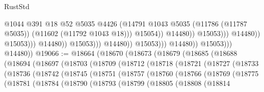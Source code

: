 \begin{lexlean}{RustStd}
\begin{coremodule}
                                                              @1044
                                                              @391
                                                              @18
                                                              @52
                                                              @5035
                                                              @4426
                                                              (@14791
                                                                @1043
                                                                @5035
                                                                (@11786 (@11787 @5035))
                                                                (@11602 (@11792 @1043 @18)))
                                                              @15054))
                                                          @14480))
                                                      @15053)))
                                                @14480))
                                            @15053)))
                                      @14480))
                                  @15053)))
                            @14480))
                        @15053)))
                  @14480))
              @15053)))
        @14480))
@19066 := @18664
    (@18670
      (@18673
        (@18679
          (@18685
            (@18688
              (@18694
                (@18697
                  (@18703
                    (@18709
                      (@18712
                        (@18718
                          (@18721
                            (@18727
                              (@18733
                                (@18736
                                  (@18742
                                    (@18745
                                      (@18751
                                        (@18757
                                          (@18760
                                            (@18766
                                              (@18769
                                                (@18775
                                                  (@18781
                                                    (@18784
                                                      (@18790
                                                        (@18793
                                                          (@18799
                                                            (@18805
                                                              (@18808
                                                                (@18814

\end{coremodule}
\end{lexlean}
